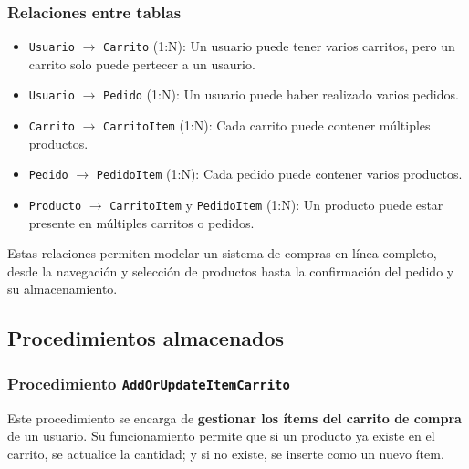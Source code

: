\documentclass[10pt]{book}
\begin{document}
    \subsubsection*{Relaciones entre tablas}
    
    \begin{itemize}
        \item \texttt{Usuario} $\rightarrow$ \texttt{Carrito} (1:N): Un usuario puede tener varios carritos, pero un carrito solo puede pertecer a un usaurio.
        \item \texttt{Usuario} $\rightarrow$ \texttt{Pedido} (1:N): Un usuario puede haber realizado varios pedidos.
        \item \texttt{Carrito} $\rightarrow$ \texttt{CarritoItem} (1:N): Cada carrito puede contener múltiples productos.
        \item \texttt{Pedido} $\rightarrow$ \texttt{PedidoItem} (1:N): Cada pedido puede contener varios productos.
        \item \texttt{Producto} $\rightarrow$ \texttt{CarritoItem} y \texttt{PedidoItem} (1:N): Un producto puede estar presente en múltiples carritos o pedidos.
    \end{itemize}
    
    Estas relaciones permiten modelar un sistema de compras en línea completo, desde la navegación y selección de productos hasta la confirmación del pedido y su almacenamiento.
    
\subsection{Procedimientos almacenados}

\subsubsection{Procedimiento \texttt{AddOrUpdateItemCarrito}}

    Este procedimiento se encarga de \textbf{gestionar los ítems del carrito de compra} de un usuario. Su funcionamiento permite que si un producto ya existe en el carrito, se actualice la cantidad; y si no existe, se inserte como un nuevo ítem.
    
\end{document}
